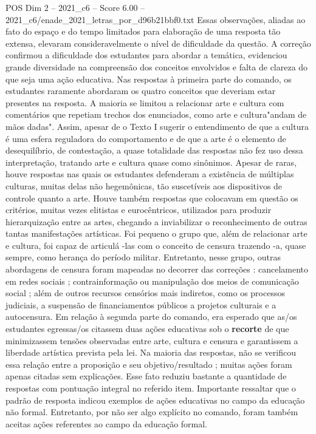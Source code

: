 \begin{textsample}{POS Dim 2 – 2021\_c6 – Score 6.00 – 2021\_c6/enade\_2021\_letras\_por\_d96b21bbf0.txt}
Essas observações, aliadas ao fato do espaço e do tempo limitados para elaboração de uma resposta tão extensa, elevaram consideravelmente o nível de dificuldade da questão.
A correção confirmou a dificuldade dos estudantes para abordar a temática, evidenciou grande diversidade na compreensão dos conceitos envolvidos e falta de clareza do que seja uma ação educativa.
Nas respostas à primeira parte do comando, os estudantes raramente abordaram os quatro conceitos que deveriam estar presentes na resposta.
A maioria se limitou a relacionar arte e cultura com comentários que repetiam trechos dos enunciados, como arte e cultura"andam de mãos dadas".
Assim, apesar de o Texto I sugerir o entendimento de que a cultura é uma esfera reguladora do comportamento e de que a arte é o elemento de desequilíbrio, de contestação, a quase totalidade das respostas não fez uso dessa interpretação, tratando arte e cultura quase como sinônimos.
Apesar de raras, houve respostas nas quais os estudantes defenderam a existência de múltiplas culturas, muitas delas não hegemônicas, tão suscetíveis aos dispositivos de controle quanto a arte.
Houve também respostas que colocavam em questão os critérios, muitas vezes elitistas e eurocêntricos, utilizados para produzir hierarquização entre as artes, chegando a inviabilizar o reconhecimento de outras tantas manifestações artísticas.
Foi pequeno o grupo que, além de relacionar arte e cultura, foi capaz de articulá -las com o conceito de censura trazendo -a, quase sempre, como herança do período militar.
Entretanto, nesse grupo, outras abordagens de censura foram mapeadas no decorrer das correções : cancelamento em redes sociais ; contrainformação ou manipulação dos meios de comunicação social ; além de outros recursos censórios mais indiretos, como os processos judiciais, a suspensão de financiamentos públicos a projetos culturais e a autocensura.
Em relação à segunda parte do comando, era esperado que as/os estudantes egressas/os citassem duas ações educativas sob o \textbf{recorte} de que minimizassem tensões observadas entre arte, cultura e censura e garantissem a liberdade artística prevista pela lei.
Na maioria das respostas, não se verificou essa relação entre a proposição e seu objetivo/resultado ; muitas ações foram apenas citadas sem explicações.
Esse fato reduziu bastante a quantidade de respostas com pontuação integral no referido item.
Importante ressaltar que o padrão de resposta indicou exemplos de ações educativas no campo da educação não formal.
Entretanto, por não ser algo explícito no comando, foram também aceitas ações referentes ao campo da educação formal.

\end{textsample}
